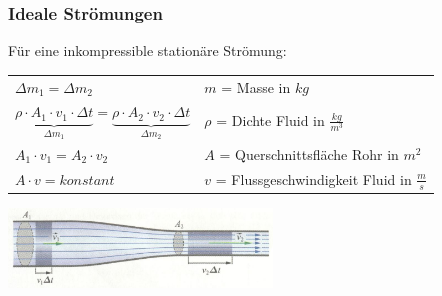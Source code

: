	\subsubsection{Ideale Strömungen}
		\begin{minipage}{12cm}
				\begin{flushleft}
					Für eine inkompressible stationäre Strömung:
				\end{flushleft}
				\quad
				\renewcommand{\arraystretch}{2}
				\begin{tabular}{ p{5.5cm} p{7cm}}
					$\Delta m_1 = \Delta m_2$	&	$m$ = Masse in $kg$\\
					$\underbrace{\rho \cdot A_1 \cdot v_1 \cdot \Delta t}_{\Delta m_1} = \underbrace{\rho \cdot A_2 \cdot v_2 \cdot \Delta t}_{\Delta m_2}$	&	$\rho$ = Dichte Fluid in $\frac{kg}{m^3}$\\
					$A_1 \cdot v_1 = A_2 \cdot v_2$	&	$A$ = Querschnittsfläche Rohr in $m^2$\\
					$A \cdot v = konstant$	&	$v$ = Flussgeschwindigkeit Fluid in $\frac{m}{s}$\\
				\end{tabular}
				\renewcommand{\arraystretch}{1}
		\end{minipage}
		\begin{minipage}{10cm}
			\vspace{-\ht\strutbox}\includegraphics[width=7cm]{./bilder/Kontinuitaetsgleichung.jpg}
		\end{minipage}
		\newline
		\newline
		\newline
		\newline
